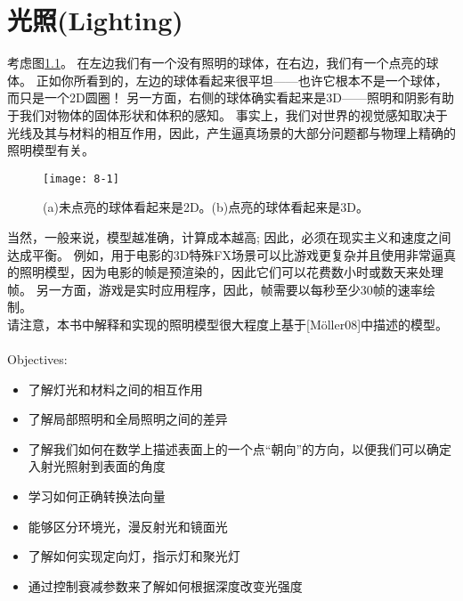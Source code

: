 \chapter{光照(Lighting)}
\begin{flushleft}
考虑图\ref{fig:8-1}。 在左边我们有一个没有照明的球体，在右边，我们有一个点亮的球体。 正如你所看到的，左边的球体看起来很平坦——也许它根本不是一个球体，而只是一个2D圆圈！ 另一方面，右侧的球体确实看起来是3D——照明和阴影有助于我们对物体的固体形状和体积的感知。 事实上，我们对世界的视觉感知取决于光线及其与材料的相互作用，因此，产生逼真场景的大部分问题都与物理上精确的照明模型有关。
\end{flushleft}

\begin{figure}[h]
    \label{fig:8-1}
    \texttt{[image: 8-1]}
    \centering
    \caption{(a)未点亮的球体看起来是2D。(b)点亮的球体看起来是3D。}
\end{figure}

\begin{flushleft}
当然，一般来说，模型越准确，计算成本越高; 因此，必须在现实主义和速度之间达成平衡。 例如，用于电影的3D特殊FX场景可以比游戏更复杂并且使用非常逼真的照明模型，因为电影的帧是预渲染的，因此它们可以花费数小时或数天来处理帧。 另一方面，游戏是实时应用程序，因此，帧需要以每秒至少30帧的速率绘制。\\
请注意，本书中解释和实现的照明模型很大程度上基于[Möller08]中描述的模型。\\
~\\
{\large Objectives:}
\begin{itemize}
    \item 了解灯光和材料之间的相互作用
    \item 了解局部照明和全局照明之间的差异
    \item 了解我们如何在数学上描述表面上的一个点“朝向”的方向，以便我们可以确定入射光照射到表面的角度
    \item 学习如何正确转换法向量
    \item 能够区分环境光，漫反射光和镜面光
    \item 了解如何实现定向灯，指示灯和聚光灯
    \item 通过控制衰减参数来了解如何根据深度改变光强度
\end{itemize}
\end{flushleft}

